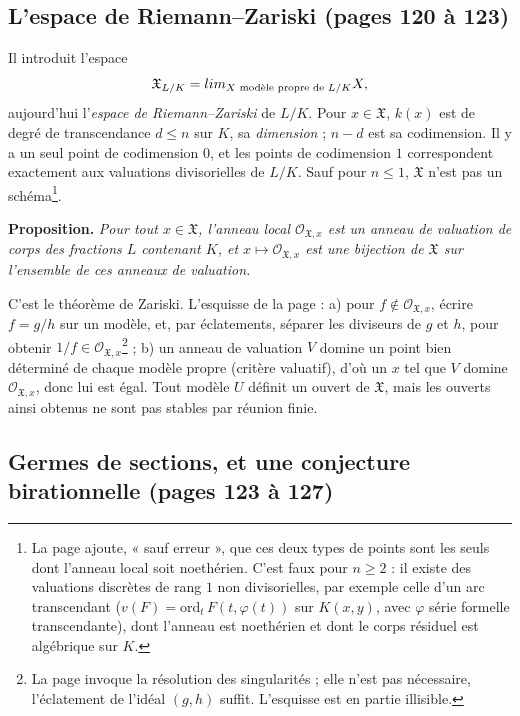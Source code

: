 \documentclass[11pt,a4paper]{article}
\begin{document}
\subsection*{L'espace de Riemann–Zariski (pages 120 à 123)}

Il introduit l'espace
\[
\mathfrak{X}_{L/K} = \varprojlim_{X \text{ modèle propre de } L/K} X ,
\]
aujourd'hui l'\emph{espace de Riemann–Zariski} de $L/K$. Pour $x \in
\mathfrak{X}$, $k(x)$ est de degré de transcendance $d \le n$ sur $K$, sa
\emph{dimension} ; $n - d$ est sa codimension. Il y a un seul point de
codimension $0$, et les points de codimension $1$ correspondent exactement aux
valuations divisorielles de $L/K$. Sauf pour $n \le 1$, $\mathfrak{X}$ n'est pas
un schéma\footnote{La page ajoute, « sauf erreur », que ces deux types de points
sont les seuls dont l'anneau local soit noethérien. C'est faux pour $n \ge 2$ :
il existe des valuations discrètes de rang $1$ non divisorielles, par exemple
celle d'un arc transcendant ($v(F) = \mathrm{ord}_t\, F(t, \varphi(t))$ sur
$K(x, y)$, avec $\varphi$ série formelle transcendante), dont l'anneau est
noethérien et dont le corps résiduel est algébrique sur $K$.}.

\textbf{Proposition.} \emph{Pour tout $x \in \mathfrak{X}$, l'anneau local
$\mathcal{O}_{\mathfrak{X},x}$ est un anneau de valuation de corps des
fractions $L$ contenant $K$, et $x \mapsto \mathcal{O}_{\mathfrak{X},x}$ est une
bijection de $\mathfrak{X}$ sur l'ensemble de ces anneaux de valuation.}

C'est le théorème de Zariski. L'esquisse de la page : a) pour $f \notin
\mathcal{O}_{\mathfrak{X},x}$, écrire $f = g/h$ sur un modèle, et, par
éclatements, séparer les diviseurs de $g$ et $h$, pour obtenir $1/f \in
\mathcal{O}_{\mathfrak{X},x}$\footnote{La page invoque la résolution des
singularités ; elle n'est pas nécessaire, l'éclatement de l'idéal $(g, h)$
suffit. L'esquisse est en partie illisible.} ; b) un anneau de valuation $V$
domine un point bien déterminé de chaque modèle propre (critère valuatif), d'où
un $x$ tel que $V$ domine $\mathcal{O}_{\mathfrak{X},x}$, donc lui est égal.
Tout modèle $U$ définit un ouvert de $\mathfrak{X}$, mais les ouverts ainsi
obtenus ne sont pas stables par réunion finie.

\subsection*{Germes de sections, et une conjecture birationnelle (pages 123 à 127)}
\end{document}
